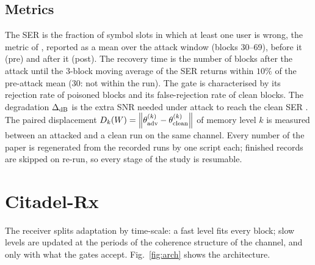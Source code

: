 \documentclass[journal]{IEEEtran}
\newcommand{\norm}[1]{\left\lVert #1 \right\rVert}
\begin{document}
\subsection{Metrics}
The SER is the fraction of symbol slots in which at least one user is wrong, the metric
of \cite{shlezinger2021,raviv2023,wu2024}, reported as a mean over the attack window
(blocks 30--69), before it (pre) and after it (post). The recovery time is the number of
blocks after the attack until the 3-block moving average of the SER returns within $10\%$
of the pre-attack mean (30: not within the run). The gate is characterised by its
rejection rate of poisoned blocks and its false-rejection rate of clean blocks. The
degradation $\Delta_{\rm dB}$ is the extra SNR needed under attack to reach the clean SER
\cite{wu2024}. The paired displacement $D_k(W)=\norm{\theta^{(k)}_{\rm adv}-\theta^{(k)}_{\rm
clean}}$ of memory level $k$ is measured between an attacked and a clean run on the same
channel. Every number of the paper is regenerated from the recorded runs by one script
each; finished records are skipped on re-run, so every stage of the study is resumable.


\section{Citadel-Rx}\label{sec:citadel}
The receiver splits adaptation by time-scale: a fast level fits every block; slow levels
are updated at the periods of the coherence structure of the channel, and only with what
the gates accept. Fig.~\ref{fig:arch} shows the architecture.
\end{document}
